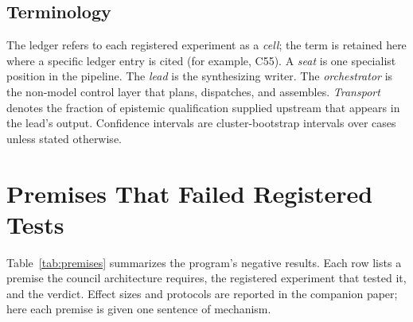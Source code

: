 \documentclass[11pt]{article}
\begin{document}
\subsection{Terminology}

The ledger refers to each registered experiment as a \emph{cell}; the
term is retained here where a specific ledger entry is cited (for
example, C55). A \emph{seat} is one specialist position in the
pipeline. The \emph{lead} is the synthesizing writer. The
\emph{orchestrator} is the non-model control layer that plans,
dispatches, and assembles. \emph{Transport} denotes the fraction of
epistemic qualification supplied upstream that appears in the lead's
output. Confidence intervals are cluster-bootstrap intervals over cases
unless stated otherwise.

\section{Premises That Failed Registered Tests}
\label{sec:premises}

Table~\ref{tab:premises} summarizes the program's negative results.
Each row lists a premise the council architecture requires, the
registered experiment that tested it, and the verdict. Effect sizes and
protocols are reported in the companion paper; here each premise is
given one sentence of mechanism.
\end{document}
